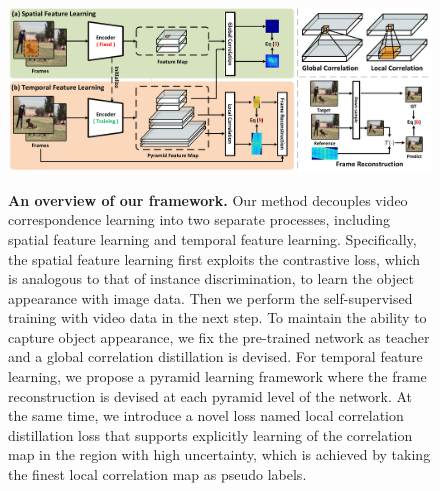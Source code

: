 \documentclass{article}
\begin{document}
\begin{figure}[!tb]
  \centering
  {\includegraphics[width=1.0\textwidth]{figure/framework/framework.pdf}}
  \caption{\small \textbf{An overview of our framework.} Our method decouples video correspondence learning into two separate processes, including spatial feature learning and temporal feature learning. Specifically, the spatial feature learning first exploits the contrastive loss, which is analogous to that of instance discrimination, to learn the object appearance with image data. Then we perform the self-supervised training with video data in the next step. To maintain the ability to capture object appearance, we fix the pre-trained network as teacher and a global correlation distillation is devised. For temporal feature learning, we propose a pyramid learning framework where the frame reconstruction is devised at each pyramid level of the network. At the same time, we introduce a novel loss named local correlation distillation loss that supports explicitly learning of the correlation map in the region with high uncertainty, which is achieved by taking the finest local correlation map as pseudo labels.}
  \label{fig:framework}
  \vspace{-5mm}
\end{figure}
\end{document}
